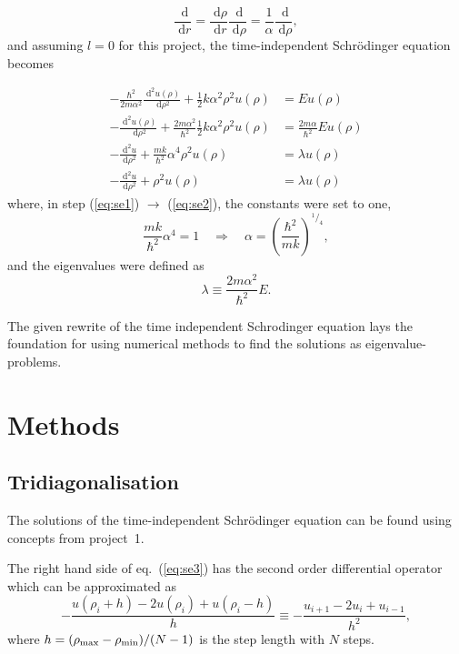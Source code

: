 \documentclass[a4paper,11pt]{article}
\newcommand{\diff}{\ensuremath{\; \text{d}}}
\begin{document}
\[ \frac{\diff}{\diff r} = \frac{\diff \rho}{\diff r} \frac{\diff}{\diff \rho} = \frac{1}{\alpha} \frac{\diff}{\diff \rho}, \]
and assuming $l=0$ for this project, the time-independent Schr\"{o}dinger equation becomes

\begin{align}
    -\frac{\hbar^2}{2m\alpha^2} \frac{\diff^2 u(\rho)}{\diff \rho^2} + \frac{1}{2} k \alpha^2 \rho^2 u(\rho) &= E u(\rho) \label{eq:se0} \\
    -\frac{\diff^2 u(\rho)}{\diff \rho^2} + \frac{2m \alpha^2}{\hbar^2}\frac{1}{2} k \alpha^2 \rho^2 u(\rho) &= \frac{2m\alpha}{\hbar^2} E u(\rho) \label{eq:se1} \\
    -\frac{\diff^2 u}{\diff \rho^2} + \frac{mk}{\hbar^2}\alpha^4 \rho^2 u(\rho) &= \lambda u(\rho) \label{eq:se2} \\
    -\frac{\diff^2 u}{\diff \rho^2} + \rho^2 u(\rho) &= \lambda u(\rho) \label{eq:se3}
\end{align}
where, in step (\ref{eq:se1}) $\to$ (\ref{eq:se2}), the constants were set to one,
\[ \frac{mk}{\hbar^2}\alpha^4 = 1 \quad \Rightarrow \quad \alpha = \left( \frac{\hbar^2}{mk}  \right)^{^1\! / _4}, \]
and the eigenvalues were defined as
\begin{equation}
    \lambda \equiv \frac{2m\alpha^2}{\hbar^2} E. 
    \label{eq:eigvals}
\end{equation}

The given rewrite of the time independent Schr{o}dinger equation lays the foundation for using numerical methods to find the solutions as eigenvalue-problems.

\section{Methods}
\subsection{Tridiagonalisation}
The solutions of the time-independent Schr\"{o}dinger equation can be found using concepts from project~1.

The right hand side of eq.~(\ref{eq:se3}) has the second order differential operator which can be approximated as
\[ -\frac{u\left( \rho_i + h \right) - 2u(\rho_i) + u\left( \rho_i - h \right)}{h} \equiv -\frac{u_{i+1} - 2u_i + u_{i-1}}{h^2}, \]
where $h = (\rho_{\rm max} - \rho_{\rm min})/(N-1)$ is the step length with $N$ steps. 
\end{document}
